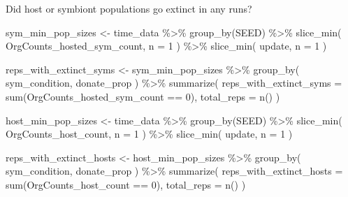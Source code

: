 \documentclass[
]{book}
\newenvironment{Shaded}{\begin{snugshade}}{\end{snugshade}}
\newcommand{\AttributeTok}[1]{\textcolor[rgb]{0.77,0.63,0.00}{#1}}
\newcommand{\DecValTok}[1]{\textcolor[rgb]{0.00,0.00,0.81}{#1}}
\newcommand{\FunctionTok}[1]{\textcolor[rgb]{0.00,0.00,0.00}{#1}}
\newcommand{\NormalTok}[1]{#1}
\newcommand{\OtherTok}[1]{\textcolor[rgb]{0.56,0.35,0.01}{#1}}
\newcommand{\SpecialCharTok}[1]{\textcolor[rgb]{0.00,0.00,0.00}{#1}}
\begin{document}
Did host or symbiont populations go extinct in any runs?

\begin{Shaded}
\begin{Highlighting}[]
\NormalTok{sym\_min\_pop\_sizes }\OtherTok{\textless{}{-}}\NormalTok{ time\_data }\SpecialCharTok{\%\textgreater{}\%}
  \FunctionTok{group\_by}\NormalTok{(SEED) }\SpecialCharTok{\%\textgreater{}\%}
  \FunctionTok{slice\_min}\NormalTok{(}
\NormalTok{    OrgCounts\_hosted\_sym\_count,}
    \AttributeTok{n =} \DecValTok{1}
\NormalTok{  ) }\SpecialCharTok{\%\textgreater{}\%}
  \FunctionTok{slice\_min}\NormalTok{(}
\NormalTok{    update,}
    \AttributeTok{n =} \DecValTok{1}
\NormalTok{  )}

\NormalTok{reps\_with\_extinct\_syms }\OtherTok{\textless{}{-}}\NormalTok{ sym\_min\_pop\_sizes }\SpecialCharTok{\%\textgreater{}\%}
  \FunctionTok{group\_by}\NormalTok{(}
\NormalTok{    sym\_condition,}
\NormalTok{    donate\_prop}
\NormalTok{  ) }\SpecialCharTok{\%\textgreater{}\%}
  \FunctionTok{summarize}\NormalTok{(}
    \AttributeTok{reps\_with\_extinct\_syms =} \FunctionTok{sum}\NormalTok{(OrgCounts\_hosted\_sym\_count }\SpecialCharTok{==} \DecValTok{0}\NormalTok{),}
    \AttributeTok{total\_reps =} \FunctionTok{n}\NormalTok{()}
\NormalTok{  )}

\NormalTok{host\_min\_pop\_sizes }\OtherTok{\textless{}{-}}\NormalTok{ time\_data }\SpecialCharTok{\%\textgreater{}\%}
  \FunctionTok{group\_by}\NormalTok{(SEED) }\SpecialCharTok{\%\textgreater{}\%}
  \FunctionTok{slice\_min}\NormalTok{(}
\NormalTok{    OrgCounts\_host\_count,}
    \AttributeTok{n =} \DecValTok{1}
\NormalTok{  ) }\SpecialCharTok{\%\textgreater{}\%}
  \FunctionTok{slice\_min}\NormalTok{(}
\NormalTok{    update,}
    \AttributeTok{n =} \DecValTok{1}
\NormalTok{  )}

\NormalTok{reps\_with\_extinct\_hosts }\OtherTok{\textless{}{-}}\NormalTok{ host\_min\_pop\_sizes }\SpecialCharTok{\%\textgreater{}\%}
  \FunctionTok{group\_by}\NormalTok{(}
\NormalTok{    sym\_condition,}
\NormalTok{    donate\_prop}
\NormalTok{  ) }\SpecialCharTok{\%\textgreater{}\%}
  \FunctionTok{summarize}\NormalTok{(}
    \AttributeTok{reps\_with\_extinct\_hosts =} \FunctionTok{sum}\NormalTok{(OrgCounts\_host\_count }\SpecialCharTok{==} \DecValTok{0}\NormalTok{),}
    \AttributeTok{total\_reps =} \FunctionTok{n}\NormalTok{()}
\NormalTok{  )}


\end{Highlighting}
\end{Shaded}
\end{document}
